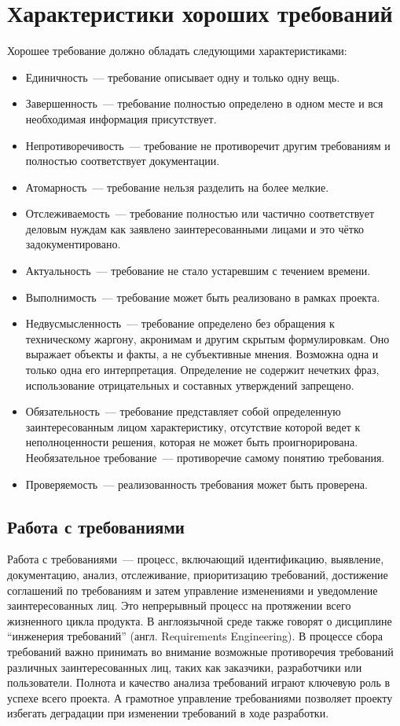 \documentclass{../../text-style}
\begin{document}
\section{Характеристики хороших требований}
Хорошее требование должно обладать следующими характеристиками:

\begin{itemize}
    \item Единичность~--- требование описывает одну и только одну вещь.
    \item Завершенность~--- требование полностью определено в одном месте и вся необходимая информация присутствует.
    \item Непротиворечивость~--- требование не противоречит другим требованиям и полностью соответствует документации.
    \item Атомарность~--- требование нельзя разделить на более мелкие.
    \item Отслеживаемость~--- требование полностью или частично соответствует деловым нуждам как заявлено заинтересованными лицами и это чётко задокументировано.
    \item Актуальность~--- требование не стало устаревшим с течением времени.
    \item Выполнимость~--- требование может быть реализовано в рамках проекта.
    \item Недвусмысленность~--- требование определено без обращения к техническому жаргону, акронимам и другим скрытым формулировкам.
    Оно выражает объекты и факты, а не субъективные мнения.
    Возможна одна и только одна его интерпретация.
    Определение не содержит нечетких фраз, использование отрицательных и составных утверждений запрещено.
    \item Обязательность~--- требование представляет собой определенную заинтересованным лицом характеристику, отсутствие которой ведет к неполноценности решения, которая не может быть проигнорирована.
    Необязательное требование~--- противоречие самому понятию требования.
    \item Проверяемость~--- реализованность требования может быть проверена.
\end{itemize}

\subsection{Работа с требованиями}

Работа с требованиями~--- процесс, включающий идентификацию, выявление, документацию, анализ, отслеживание, приоритизацию требований, достижение соглашений по требованиям и затем управление изменениями и уведомление заинтересованных лиц.
Это непрерывный процесс на протяжении всего жизненного цикла продукта.
В англоязычной среде также говорят о дисциплине \enquote{инженерия требований} (англ. Requirements Engineering).
В процессе сбора требований важно принимать во внимание возможные противоречия требований различных заинтересованных лиц, таких как заказчики, разработчики или пользователи.
Полнота и качество анализа требований играют ключевую роль в успехе всего проекта.
А грамотное управление требованиями позволяет проекту избегать деградации при изменении требований в ходе разработки.
\end{document}
